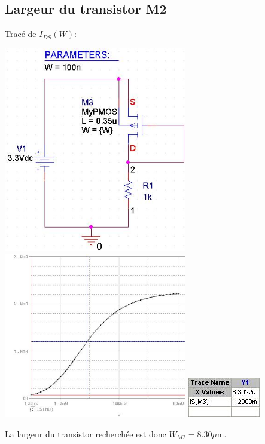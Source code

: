 \documentclass[10pt]{article}
\begin{document}
   \subsection{Largeur du transistor M2}
    \begin{center}
     Tracé de $I_{DS}(W)$:

     \includegraphics[width=8cm]{II-II-a_is-w_circuit.jpg}
     \includegraphics[width=8cm]{II-II-a_is-w_simu.jpg}
     \includegraphics{II-II-a_is-w_values.jpg}
    \end{center}
    La largeur du transistor recherchée est donc $W_{M2}=8.30\mu$m.

   \subsection{}
\end{document}
